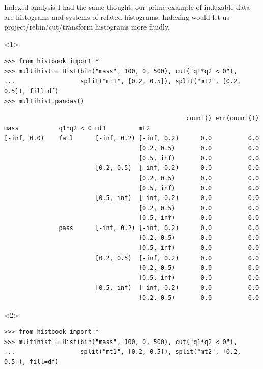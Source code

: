 \documentclass[aspectratio=169]{beamer}
\begin{document}
\begin{frame}[fragile]{Indexed analysis}
\large
\vspace{0.25 cm}
I had the same thought: our prime example of indexable data are histograms and systems of related histograms. Indexing would let us project/rebin/cut/transform histograms more fluidly.

\vspace{0.25 cm}
\begin{onlyenv}<1>
\scriptsize
\begin{verbatim}
>>> from histbook import *
>>> multihist = Hist(bin("mass", 100, 0, 500), cut("q1*q2 < 0"),
...                  split("mt1", [0.2, 0.5]), split("mt2", [0.2, 0.5]), fill=df)
>>> multihist.pandas()
\end{verbatim}
\tiny
\vspace{-0.25 cm}
\begin{verbatim}
                                                  count() err(count())
mass           q1*q2 < 0 mt1         mt2
[-inf, 0.0)    fail      [-inf, 0.2) [-inf, 0.2)      0.0          0.0
                                     [0.2, 0.5)       0.0          0.0
                                     [0.5, inf)       0.0          0.0
                         [0.2, 0.5)  [-inf, 0.2)      0.0          0.0
                                     [0.2, 0.5)       0.0          0.0
                                     [0.5, inf)       0.0          0.0
                         [0.5, inf)  [-inf, 0.2)      0.0          0.0
                                     [0.2, 0.5)       0.0          0.0
                                     [0.5, inf)       0.0          0.0
               pass      [-inf, 0.2) [-inf, 0.2)      0.0          0.0
                                     [0.2, 0.5)       0.0          0.0
                                     [0.5, inf)       0.0          0.0
                         [0.2, 0.5)  [-inf, 0.2)      0.0          0.0
                                     [0.2, 0.5)       0.0          0.0
                                     [0.5, inf)       0.0          0.0
                         [0.5, inf)  [-inf, 0.2)      0.0          0.0
                                     [0.2, 0.5)       0.0          0.0
\end{verbatim}
\end{onlyenv}
\begin{onlyenv}<2>
\scriptsize
\begin{verbatim}
>>> from histbook import *
>>> multihist = Hist(bin("mass", 100, 0, 500), cut("q1*q2 < 0"),
...                  split("mt1", [0.2, 0.5]), split("mt2", [0.2, 0.5]), fill=df)

\end{verbatim}
\end{onlyenv}
\end{frame}
\end{document}
